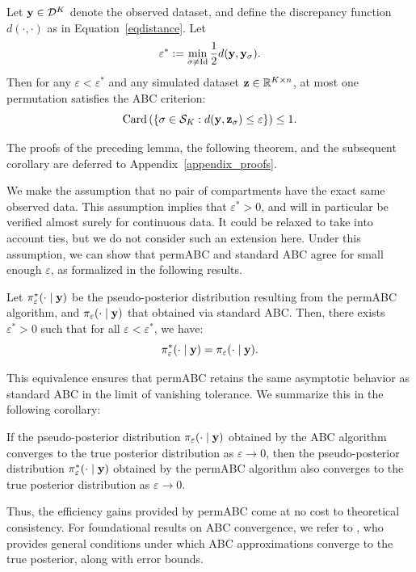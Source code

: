 \begin{lemma}
\label{lempermABC_star}
Let $\mathbf{y} \in \mathcal{D}^K$ denote the observed dataset, and define the discrepancy function $d(\cdot, \cdot)$ as in Equation~\eqref{eqdistance}. Let
\[
\varepsilon^* := \min_{\sigma \neq \mathrm{Id}} \frac{1}{2} d(\mathbf{y}, \mathbf{y}_\sigma).
\]
Then for any $\varepsilon < \varepsilon^*$ and any simulated dataset $\mathbf{z} \in \mathbb{R}^{K \times n}$, at most one permutation satisfies the ABC criterion:
\[
\mathrm{Card} \left( \left\{ \sigma \in \mathcal{S}_K : d(\mathbf{y}, \mathbf{z}_\sigma) \leq \varepsilon \right\} \right) \leq 1.
\]
\end{lemma}

The proofs of the preceding lemma, the following theorem, and the subsequent corollary are deferred to Appendix~\ref{appendix_proofs}. 

We make the assumption that no pair of compartments have the exact same observed data. This assumption implies that $\varepsilon^*>0$, and will in particular be verified almost surely for continuous data. It could be relaxed to take into account ties, but we do not consider such an extension here. Under this assumption, we can show that permABC and standard ABC agree for small enough $\varepsilon$, as formalized in the following results.

\begin{theorem}
\label{th:permABC_star}
Let $\pi^*_{\varepsilon}( \cdot \mid \mathbf{y})$ be the pseudo-posterior distribution resulting from the permABC algorithm, and $\pi_{\varepsilon}( \cdot \mid \mathbf{y})$ that obtained via standard ABC. Then, there exists $\varepsilon^*>0$ such that for all $\varepsilon < \varepsilon^*$, we have:
\[
\pi^*_{\varepsilon}( \cdot \mid \mathbf{y}) = \pi_{\varepsilon}( \cdot \mid \mathbf{y}).
\]
\end{theorem}

This equivalence ensures that permABC retains the same asymptotic behavior as standard ABC in the limit of vanishing tolerance. We summarize this in the following corollary:

\begin{corollary}
\label{col:permabc}
If the pseudo-posterior distribution $\pi_{\varepsilon}(\cdot \mid \mathbf{y})$ obtained by the ABC algorithm converges to the true posterior distribution as $\varepsilon \to 0$, then the pseudo-posterior distribution $\pi_{\varepsilon}^*(\cdot \mid \mathbf{y})$ obtained by the permABC algorithm also converges to the true posterior distribution as $\varepsilon \to 0$.
\end{corollary}

Thus, the efficiency gains provided by permABC come at no cost to theoretical consistency. For foundational results on ABC convergence, we refer to \citet{fearnhead2018abc}, who provides general conditions under which ABC approximations converge to the true posterior, along with error bounds.




